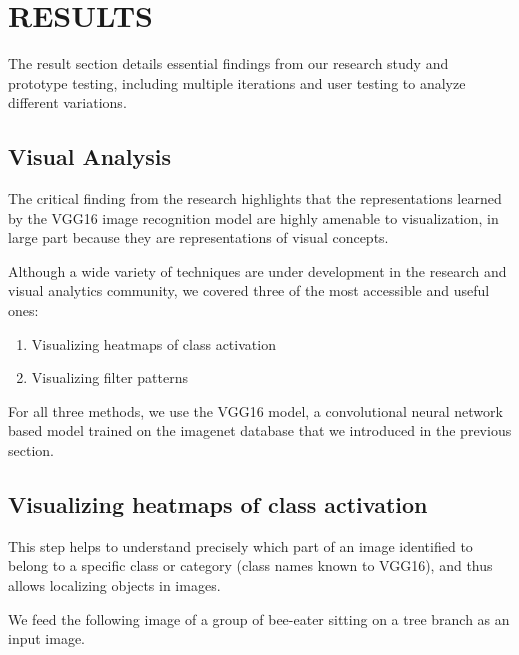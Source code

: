 \chapter{RESULTS}

\graphicspath{ {./results/} }
\thispagestyle{empty}


The result section details essential findings from our research study and prototype testing, including multiple iterations and user testing to analyze different variations.

\section{Visual Analysis}

The critical finding from the research highlights that the representations learned by the VGG16 image recognition model are highly amenable to visualization, in large part because they are representations of visual concepts. 

Although a wide variety of techniques are under development in the research and visual analytics community, we covered three of the most accessible and useful ones:

\begin{enumerate}
\item Visualizing heatmaps of class activation
\item Visualizing filter patterns
\end{enumerate}

For all three methods, we use the VGG16 model, a convolutional neural network based model trained on the imagenet database that we introduced in the previous section.

\section*{Visualizing heatmaps of class activation}

This step helps to understand precisely which part of an image identified to belong to a specific class or category (class names known to VGG16), and thus allows localizing objects in images.

We feed the following image of a group of bee-eater sitting on a tree branch as an input image.

